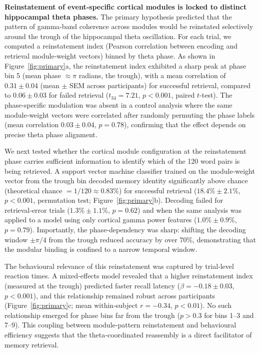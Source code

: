 \documentclass{article}
\begin{document}
\textbf{Reinstatement of event‑specific cortical modules is locked to distinct hippocampal theta phases.}
The primary hypothesis predicted that the pattern of gamma‑band coherence across modules would be reinstated selectively around the trough of the hippocampal theta oscillation. For each trial, we computed a reinstatement index (Pearson correlation between encoding and retrieval module‑weight vectors) binned by theta phase. As shown in Figure~\ref{fig:primary}a, the reinstatement index exhibited a sharp peak at phase bin 5 (mean phase $\approx\pi$ radians, the trough), with a mean correlation of $0.31 \pm 0.04$ (mean $\pm$ SEM across participants) for successful retrieval, compared to $0.06 \pm 0.03$ for failed retrieval ($t_{34} = 7.21$, $p < 0.001$, paired $t$‑test). The phase‑specific modulation was absent in a control analysis where the same module‑weight vectors were correlated after randomly permuting the phase labels (mean correlation $0.03 \pm 0.04$, $p = 0.78$), confirming that the effect depends on precise theta phase alignment.

We next tested whether the cortical module configuration at the reinstatement phase carries sufficient information to identify which of the 120 word pairs is being retrieved. A support vector machine classifier trained on the module‑weight vector from the trough bin decoded memory identity significantly above chance (theoretical chance $= 1/120 \approx 0.83\%$) for successful retrieval ($18.4\% \pm 2.1\%$, $p < 0.001$, permutation test; Figure~\ref{fig:primary}b). Decoding failed for retrieval‑error trials ($1.3\% \pm 1.1\%$, $p = 0.62$) and when the same analysis was applied to a model using only cortical gamma power features ($1.0\% \pm 0.9\%$, $p = 0.79$). Importantly, the phase‑dependency was sharp: shifting the decoding window $\pm\pi/4$ from the trough reduced accuracy by over $70\%$, demonstrating that the modular binding is confined to a narrow temporal window.

The behavioural relevance of this reinstatement was captured by trial‑level reaction times. A mixed‑effects model revealed that a higher reinstatement index (measured at the trough) predicted faster recall latency ($\beta = -0.18 \pm 0.03$, $p < 0.001$), and this relationship remained robust across participants (Figure~\ref{fig:primary}c; mean within‑subject $r = -0.34$, $p < 0.01$). No such relationship emerged for phase bins far from the trough ($p > 0.3$ for bins 1–3 and 7–9). This coupling between module‑pattern reinstatement and behavioural efficiency suggests that the theta‑coordinated reassembly is a direct facilitator of memory retrieval.
\end{document}
